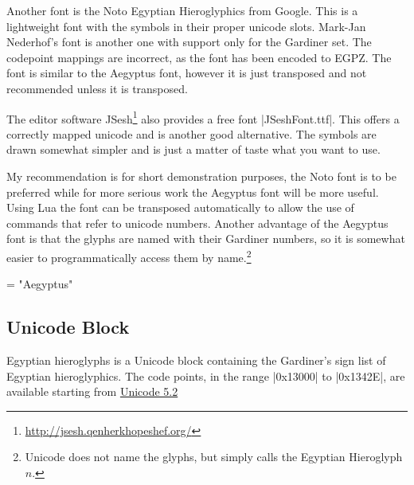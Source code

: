 Another font is the Noto Egyptian Hieroglyphics from Google. This is a lightweight font with the symbols in their proper unicode slots. Mark-Jan Nederhof's  font is another one with support only for the Gardiner set. The codepoint mappings are incorrect, as the font has been  
encoded to EGPZ. The font is similar to the Aegyptus font, however it is just transposed and not recommended unless it is transposed. 

The editor software JSesh\footnote{\protect\url{http://jsesh.qenherkhopeshef.org/}} also provides a free font |JSeshFont.ttf|. This offers a correctly mapped unicode and is another good alternative. The symbols are drawn somewhat simpler and is just a matter of taste what you want to use.

My recommendation is for short demonstration purposes, the Noto font is to be preferred while for more serious work the Aegyptus font will be more useful. Using Lua the font can be transposed automatically to allow the use of commands that refer to unicode numbers. Another advantage of the Aegyptus font is that the glyphs are named with their Gardiner numbers, so it is somewhat easier to programmatically access them by name.\footnote{Unicode does not name the glyphs, but simply calls the Egyptian Hieroglyph $n$. } 

\medskip

\ifxetex
\bgroup
\centering 
\font\myfont = "Aegyptus"
\scalebox{7}{\myfont\XeTeXglyph 201}
\scalebox{7}{\myfont\XeTeXglyph 203}
\scalebox{7}{\myfont\XeTeXglyph 163}
\scalebox{7}{\myfont\XeTeXglyph 164}
\scalebox{7}{\myfont\XeTeXglyph 165}
\scalebox{7}{\myfont\XeTeXglyph 168}
\egroup
\fi

\ifluatex
\bgroup
\centering 
\aegyptus
\scalebox{7}{\char"F300C}
\scalebox{7}{\char"F3001}
\scalebox{7}{\char"F3010}
\scalebox{7}{\char"F308B}
\scalebox{7}{\char"F3097}
\scalebox{7}{\char"F3091}
\egroup

\fi


\subsection{Unicode Block}

Egyptian hieroglyphs is a Unicode block containing the Gardiner's sign list of Egyptian hieroglyphics.
The code points, in the range |0x13000| to |0x1342E|, are available starting from
\href{http://unicode.org/charts/PDF/U13000.pdf}{Unicode 5.2}

